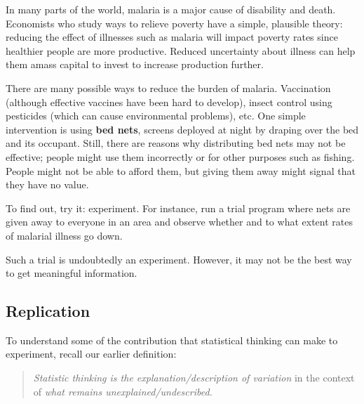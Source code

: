 \documentclass[
  letterpaper,
  DIV=11,
  numbers=noendperiod,
  oneside]{scrartcl}
\begin{document}
\begin{tcolorbox}[enhanced jigsaw, colbacktitle=quarto-callout-note-color!10!white, opacityback=0, breakable, opacitybacktitle=0.6, colback=white, coltitle=black, arc=.35mm, title=\textcolor{quarto-callout-note-color}{\faInfo}\hspace{0.5em}{Example: Malaria and bed nets}, left=2mm, colframe=quarto-callout-note-color-frame, rightrule=.15mm, bottomrule=.15mm, leftrule=.75mm, bottomtitle=1mm, toptitle=1mm, titlerule=0mm, toprule=.15mm]

In many parts of the world, malaria is a major cause of disability and
death. Economists who study ways to relieve poverty have a simple,
plausible theory: reducing the effect of illnesses such as malaria will
impact poverty rates since healthier people are more productive. Reduced
uncertainty about illness can help them amass capital to invest to
increase production further.

There are many possible ways to reduce the burden of malaria.
Vaccination (although effective vaccines have been hard to develop),
insect control using pesticides (which can cause environmental
problems), etc. One simple intervention is using \textbf{bed nets},
screens deployed at night by draping over the bed and its occupant.
Still, there are reasons why distributing bed nets may not be effective;
people might use them incorrectly or for other purposes such as fishing.
People might not be able to afford them, but giving them away might
signal that they have no value.

To find out, try it: experiment. For instance, run a trial program where
nets are given away to everyone in an area and observe whether and to
what extent rates of malarial illness go down.

Such a trial is undoubtedly an experiment. However, it may not be the
best way to get meaningful information.

\end{tcolorbox}

\subsection{Replication}\label{replication}

To understand some of the contribution that statistical thinking can
make to experiment, recall our earlier definition:

\begin{quote}
\emph{Statistic thinking is the explanation/description of variation} in
the context of \emph{what remains unexplained/undescribed.}
\end{quote}
\end{document}
